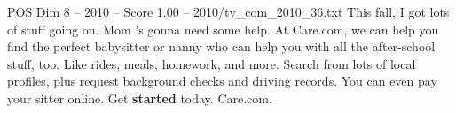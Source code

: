 \begin{textsample}{POS Dim 8 – 2010 – Score 1.00 – 2010/tv\_com\_2010\_36.txt}  \label{ex:f8_pos_054}
This fall, I got lots of stuff going on.
Mom 's gonna need some help.
At Care.com, we can help you find the perfect babysitter or nanny who can help you with all the after-school stuff, too.
Like rides, meals, homework, and more.
Search from lots of local profiles, plus request background checks and driving records.
You can even pay your sitter online.
Get \textbf{started} today.
Care.com.

\end{textsample}
